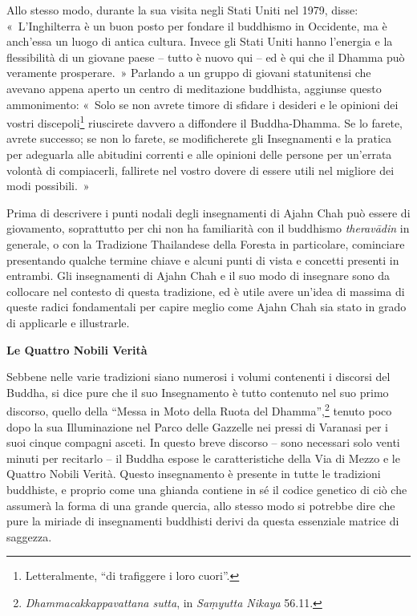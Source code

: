 Allo stesso modo, durante la sua visita negli Stati Uniti nel 1979,
disse: «~L'Inghilterra è un buon posto per fondare il buddhismo in
Occidente, ma è anch'essa un luogo di antica cultura. Invece gli Stati
Uniti hanno l'energia e la flessibilità di un giovane paese -- tutto è
nuovo qui -- ed è qui che il Dhamma può veramente prosperare.~» Parlando
a un gruppo di giovani statunitensi che avevano appena aperto un centro
di meditazione buddhista, aggiunse questo ammonimento: «~Solo se non
avrete timore di sfidare i desideri e le opinioni dei vostri
discepoli\footnote{Letteralmente, ``di trafiggere i loro cuori''.}
riuscirete davvero a diffondere il Buddha-Dhamma. Se lo farete, avrete
successo; se non lo farete, se modificherete gli Insegnamenti e la
pratica per adeguarla alle abitudini correnti e alle opinioni delle
persone per un'errata volontà di compiacerli, fallirete nel vostro
dovere di essere utili nel migliore dei modi possibili.~»

Prima di descrivere i punti nodali degli insegnamenti di Ajahn Chah può
essere di giovamento, soprattutto per chi non ha familiarità con il
buddhismo \emph{theravādin} in generale, o con la Tradizione Thailandese
della Foresta in particolare, cominciare presentando qualche termine
chiave e alcuni punti di vista e concetti presenti in entrambi. Gli
insegnamenti di Ajahn Chah e il suo modo di insegnare sono da collocare
nel contesto di questa tradizione, ed è utile avere un'idea di massima
di queste radici fondamentali per capire meglio come Ajahn Chah sia
stato in grado di applicarle e illustrarle.

\textbf{Le Quattro Nobili Verità}

Sebbene nelle varie tradizioni siano numerosi i volumi contenenti i
discorsi del Buddha, si dice pure che il suo Insegnamento è tutto
contenuto nel suo primo discorso, quello della ``Messa in Moto della
Ruota del Dhamma'',\footnote{\emph{Dhammacakkappavattana sutta}, in
  \emph{Saṃyutta Nikaya} 56.11.} tenuto poco dopo la sua Illuminazione
nel Parco delle Gazzelle nei pressi di Varanasi per i suoi cinque
compagni asceti. In questo breve discorso -- sono necessari solo venti
minuti per recitarlo -- il Buddha espose le caratteristiche della Via di
Mezzo e le Quattro Nobili Verità. Questo insegnamento è presente in
tutte le tradizioni buddhiste, e proprio come una ghianda contiene in sé
il codice genetico di ciò che assumerà la forma di una grande quercia,
allo stesso modo si potrebbe dire che pure la miriade di insegnamenti
buddhisti derivi da questa essenziale matrice di saggezza.

